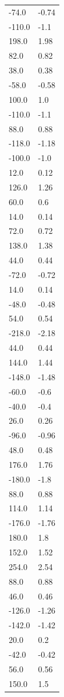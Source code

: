 \begin{longtable}{ll}
-74.0 & -0.74 \\
-110.0 & -1.1 \\
198.0 & 1.98 \\
82.0 & 0.82 \\
38.0 & 0.38 \\
-58.0 & -0.58 \\
100.0 & 1.0 \\
-110.0 & -1.1 \\
88.0 & 0.88 \\
-118.0 & -1.18 \\
-100.0 & -1.0 \\
12.0 & 0.12 \\
126.0 & 1.26 \\
60.0 & 0.6 \\
14.0 & 0.14 \\
72.0 & 0.72 \\
138.0 & 1.38 \\
44.0 & 0.44 \\
-72.0 & -0.72 \\
14.0 & 0.14 \\
-48.0 & -0.48 \\
54.0 & 0.54 \\
-218.0 & -2.18 \\
44.0 & 0.44 \\
144.0 & 1.44 \\
-148.0 & -1.48 \\
-60.0 & -0.6 \\
-40.0 & -0.4 \\
26.0 & 0.26 \\
-96.0 & -0.96 \\
48.0 & 0.48 \\
176.0 & 1.76 \\
-180.0 & -1.8 \\
88.0 & 0.88 \\
114.0 & 1.14 \\
-176.0 & -1.76 \\
180.0 & 1.8 \\
152.0 & 1.52 \\
254.0 & 2.54 \\
88.0 & 0.88 \\
46.0 & 0.46 \\
-126.0 & -1.26 \\
-142.0 & -1.42 \\
20.0 & 0.2 \\
-42.0 & -0.42 \\
56.0 & 0.56 \\
150.0 & 1.5 \\

\end{longtable}
